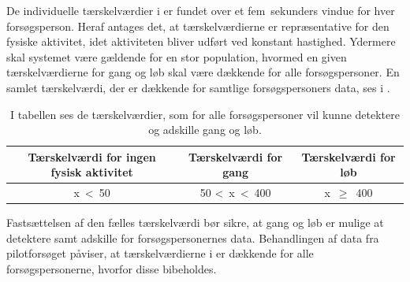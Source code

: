 De individuelle tærskelværdier i  er fundet over et fem~sekunders vindue for hver forsøgsperson. Heraf antages det, at tærskelværdierne er repræsentative for den fysiske aktivitet, idet aktiviteten bliver udført ved konstant hastighed. Ydermere skal systemet være gældende for en stor population, hvormed en given tærskelværdierne for gang og løb skal være dækkende for alle forsøgspersoner. En samlet tærskelværdi, der er dækkende for samtlige forsøgspersoners data, ses i .
\begin{table}[H]
	\centering
	\begin{tabular}{ccc}
		\hline
		\rowcolor[HTML]{C0C0C0} 
		Tærskelværdi for ingen fysisk aktivitet & Tærskelværdi for gang & Tærskelværdi for løb \\ \hline
		x~\textless~50 & 50 \textless~x~\textless~400 & x~$\geq$~400 \\ \hline
	\end{tabular}
	\caption{I tabellen ses de tærskelværdier, som for alle forsøgspersoner vil kunne detektere og adskille gang og løb.}
	\label{tab:faelles_taerskel}
\end{table}\vspace{-0.5cm}
Fastsættelsen af den fælles tærskelværdi bør sikre, at gang og løb er mulige at detektere samt adskille for forsøgspersonernes data. Behandlingen af data fra pilotforsøget påviser, at tærskelværdierne i  er dækkende for alle forsøgspersonerne, hvorfor disse bibeholdes.

